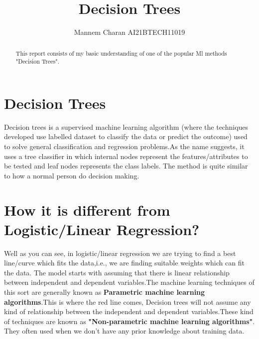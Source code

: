 \documentclass[journal,12pt,onecolumn]{IEEEtran}
\theoremstyle{remark}
\numberwithin{equation}{section}
\begin{document}
		\title{Decision Trees}
		\maketitle
		\author{ Mannem Charan AI21BTECH11019}
		\begin{abstract}
			This report consists of my basic understanding of one of the popular Ml methods "Decision Trees".
		\end{abstract}
                \section{Decision Trees}
                 Decision trees is a supervised machine learning algorithm (where the techniques developed use labelled dataset to classify the data or predict the outcome) used to solve general classification and regression problems.As the name suggests, it uses a tree classifier in which internal nodes represent the features/attributes to be tested and leaf nodes represents the class labels. The method is quite similar to how a normal person do decision making.
                \section{How it is different from Logistic/Linear Regression?}
                 Well as you can see, in logistic/linear regression we are trying to find a best line/curve which fits the data,i.e., we are finding suitable weights which can fit the data. The model starts with assuming that there is linear relationship between independent and dependent variables.The machine learning techniques of this sort are generally known as \textbf{Parametric machine learning algorithms}.This is where the red line comes, Decision trees will not assume any kind of relationship between the independent and dependent variables.These kind of techniques are known as \textbf{"Non-parametric machine learning algorithms"}.
They often used when we don't have any prior knowledge about training data.
\end{document}
